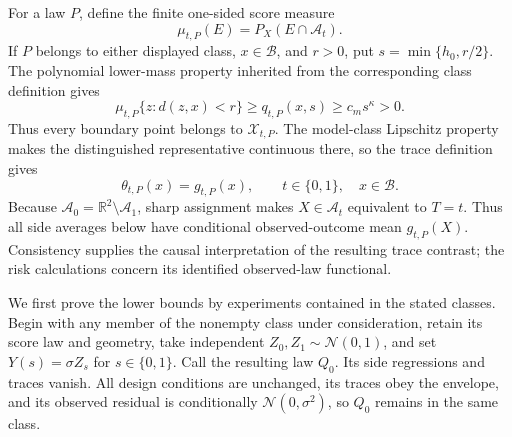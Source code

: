 For a law \(P\), define the finite one-sided score measure
\[
 \mu_{t,P}(E)=P_X(E\cap\mathcal A_t).
\]
If \(P\) belongs to either displayed class, \(x\in\mathcal B\), and \(r>0\), put \(s=\min\{h_0,r/2\}\). The polynomial lower-mass property inherited from the corresponding class definition gives
\[
 \mu_{t,P}\{z:d(z,x)<r\}
 \ge q_{t,P}(x,s)
 \ge c_ms^{\kappa}>0. \tag{23}
\]
Thus every boundary point belongs to \(\mathcal X_{t,P}\). The model-class Lipschitz property makes the distinguished representative continuous there, so the trace definition gives
\[
 \theta_{t,P}(x)=g_{t,P}(x),
 \qquad t\in\{0,1\},\quad x\in\mathcal B. \tag{24}
\]
Because \(\mathcal A_0=\mathbb R^2\setminus\mathcal A_1\), sharp assignment makes \(X\in\mathcal A_t\) equivalent to \(T=t\). Thus all side averages below have conditional observed-outcome mean \(g_{t,P}(X)\). Consistency supplies the causal interpretation of the resulting trace contrast; the risk calculations concern its identified observed-law functional.

We first prove the lower bounds by experiments contained in the stated classes. Begin with any member of the nonempty class under consideration, retain its score law and geometry, take independent \(Z_0,Z_1\sim\mathcal N(0,1)\), and set \(Y(s)=\sigma Z_s\) for \(s\in\{0,1\}\). Call the resulting law \(Q_0\). Its side regressions and traces vanish. All design conditions are unchanged, its traces obey the envelope, and its observed residual is conditionally \(\mathcal N(0,\sigma^2)\), so \(Q_0\) remains in the same class.


